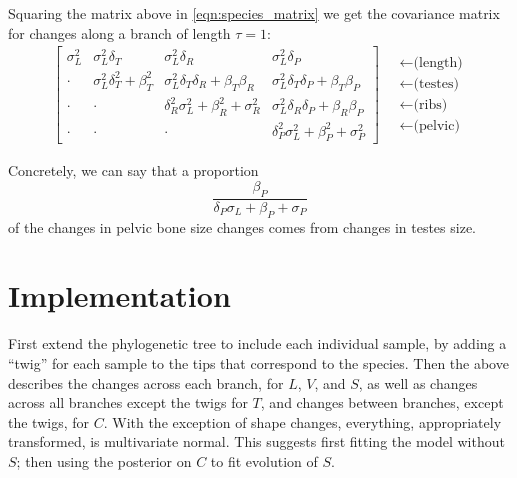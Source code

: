 \documentclass{article}
\begin{document}
Squaring the matrix above in \eqref{eqn:species_matrix} we get the covariance matrix 
for changes along a branch of length $\tau = 1$:
\begin{align}
\begin{bmatrix}
  \sigma_L^2 &  \sigma_L^2 \delta_T   & \sigma_L^2 \delta_R  & \sigma_L^2 \delta_P   \\
  \cdot &  \sigma_L^2 \delta_T^2 + \beta_T^2 & \sigma_L^2 \delta_T \delta_R + \beta_T \beta_R   &   \sigma_L^2 \delta_T \delta_P + \beta_T \beta_P \\
    \cdot  &  \cdot & \delta_R^2 \sigma_L^2 + \beta_R^2 + \sigma_R^2 &   \sigma_L^2 \delta_R \delta_P + \beta_R \beta_P  \\
    \cdot  &  \cdot  & \cdot  &  \delta_P^2 \sigma_L^2 + \beta_P^2 + \sigma_P^2  
\end{bmatrix}
\quad \begin{matrix}
  \leftarrow \text{(length)} \\
  \leftarrow \text{(testes)} \\
  \leftarrow \text{(ribs)} \\
  \leftarrow \text{(pelvic)} 
\end{matrix}
\end{align}

Concretely, we can say that a proportion
\[
\frac{\beta_P}{ \delta_P \sigma_L + \beta_P + \sigma_P }
\]
of the changes in pelvic bone size changes
comes from changes in testes size.


\section{Implementation}

First extend the phylogenetic tree to include each individual sample, by adding a ``twig'' for each sample
to the tips that correspond to the species.
Then the above describes the changes across each branch, 
for $L$, $V$, and $S$,
as well as changes across all branches except the twigs for $T$,
and changes between branches, except the twigs, for $C$.
With the exception of shape changes, everything, appropriately transformed, 
is multivariate normal.
This suggests first fitting the model without $S$;
then using the posterior on $C$ to fit evolution of $S$.
\end{document}
